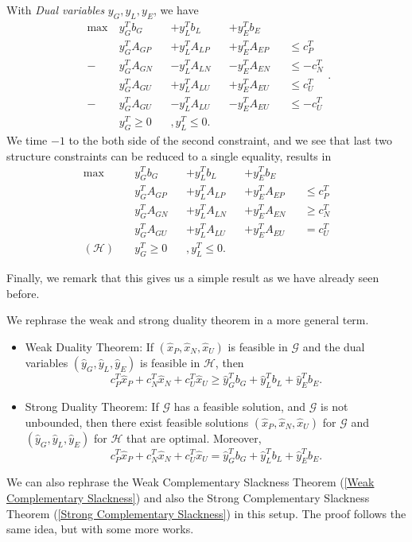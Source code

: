 With \emph{Dual variables} \(y_G, y_L, y_E\), we have
\[
	\begin{alignedat}{4}
		\max~ & y^{T}_G b_G &&+ y^{T}_L b_L &&+ y^{T}_E b_E                     \\
		& y^{T}_G A_{GP} &&+ y^{T}_L A_{LP} &&+ y^{T}_E A_{EP} &&\leq c^{T}_P   \\
		-& y^{T}_G A_{GN} &&- y^{T}_L A_{LN} &&- y^{T}_E A_{EN} &&\leq -c^{T}_N \\
		& y^{T}_G A_{GU} &&+ y^{T}_L A_{LU} &&+ y^{T}_E A_{EU} &&\leq c^{T}_U   \\
		-& y^{T}_G A_{GU} &&- y^{T}_L A_{LU} &&- y^{T}_E A_{EU} &&\leq -c^{T}_U \\
		&y^{T}_G \geq 0&&, y^{T}_L\leq 0.
	\end{alignedat}.
\]
We time \(-1\) to the both side of the second constraint, and we see that last two structure constraints can be reduced to a single equality, results in
\[
	\begin{alignedat}{4}
		\max~ & y^{T}_G b_G &&+ y^{T}_L b_L &&+ y^{T}_E b_E                     \\
		& y^{T}_G A_{GP} &&+ y^{T}_L A_{LP} &&+ y^{T}_E A_{EP} &&\leq c^{T}_P   \\
		& y^{T}_G A_{GN} &&+ y^{T}_L A_{LN} &&+ y^{T}_E A_{EN} &&\geq c^{T}_N \\
		& y^{T}_G A_{GU} &&+ y^{T}_L A_{LU} &&+ y^{T}_E A_{EU} && = c^{T}_U     \\
		(\mathcal{H})\quad &y^{T}_G \geq 0&&, y^{T}_L\leq 0.
	\end{alignedat}
\]

Finally, we remark that this gives us a simple result as we have already seen before.
\begin{theorem}
	We rephrase the weak and strong duality theorem in a more general term.
	\begin{itemize}
		\item Weak Duality Theorem: If \((\hat{x}_P, \hat{x}_N, \hat{x}_U)\) is feasible in \(\mathcal{G}\) and the dual variables \((\hat{y}_G, \hat{y}_L, \hat{y}_E)\) is
		      feasible in \(\mathcal{H}\), then
		      \[
			      c^{T}_P \hat{x}_P + c^{T}_N \hat{x}_N + c^{T}_U \hat{x}_U \geq \hat{y}^{T}_G b_G + \hat{y}^{T}_L b_L + \hat{y}^{T}_E b_E.
		      \]
		\item Strong Duality Theorem: If \(\mathcal{G}\) has a feasible solution, and \(\mathcal{G}\) is not unbounded, then there exist feasible
		      solutions \((\hat{x}_P, \hat{x}_N, \hat{x}_U)\) for \(\mathcal{G}\) and \((\hat{y}_G, \hat{y}_L, \hat{y}_E)\) for \(\mathcal{H}\) that are optimal.
		      Moreover,
		      \[
			      c^{T}_P \hat{x}_P + c^{T}_N \hat{x}_N + c^{T}_U \hat{x}_U = \hat{y}^{T}_G b_G + \hat{y}^{T}_L b_L + \hat{y}^{T}_E b_E.
		      \]
	\end{itemize}
\end{theorem}

\begin{remark}
	We can also rephrase the Weak Complementary Slackness Theorem (\autoref{Weak Complementary Slackness}) and also the Strong Complementary Slackness Theorem (\autoref{Strong Complementary Slackness})
	in this setup. The proof follows the same idea, but with some more works.
\end{remark}